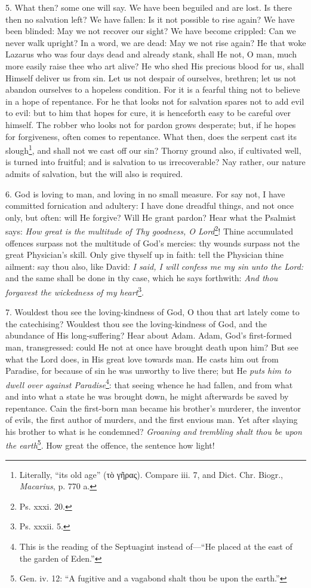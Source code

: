 5. What then? some one will say. We have been beguiled and are lost. Is there then no salvation left? We have fallen: Is it not possible to rise again? We have been blinded: May we not recover our sight? We have become crippled: Can we never walk upright? In a word, we are dead: May we not rise again? He that woke Lazarus who was four days dead and already stank, shall He not, O man, much more easily raise thee who art alive? He who shed His precious blood for us, shall Himself deliver us from sin. Let us not despair of ourselves, brethren; let us not abandon ourselves to a hopeless condition. For it is a fearful thing not to believe in a hope of repentance. For he that looks not for salvation spares not to add evil to evil: but to him that hopes for cure, it is henceforth easy to be careful over himself. The robber who looks not for pardon grows desperate; but, if he hopes for forgiveness, often comes to repentance. What then, does the serpent cast its slough\footnote{Literally, “its old age” (\textgreek{τὸ γῆρας}). Compare iii. 7, and Dict. Chr. Biogr., \emph{Macarius}, p. 770 a.}, and shall not we cast off our sin? Thorny ground also, if cultivated well, is turned into fruitful; and is salvation to us irrecoverable? Nay rather, our nature admits of salvation, but the will also is required.

6. God is loving to man, and loving in no small measure. For say not, I have committed fornication and adultery: I have done dreadful things, and not once only, but often: will He forgive? Will He grant pardon? Hear what the Psalmist says: \emph{How great is the multitude of Thy goodness, O Lord}\footnote{Ps. xxxi. 20.}! Thine accumulated offences surpass not the multitude of God’s mercies: thy wounds surpass not the great Physician’s skill. Only give thyself up in faith: tell the Physician thine ailment: say thou also, like David: \emph{I said, I will confess me my sin unto the Lord:} and the same shall be done in thy case, which he says forthwith: \emph{And thou forgavest the wickedness of my heart}\footnote{Ps. xxxii. 5.}.

7. Wouldest thou see the loving-kindness of God, O thou that art lately come to the catechising? Wouldest thou see the loving-kindness of God, and the abundance of His long-suffering? Hear about Adam. Adam, God’s first-formed man, transgressed: could He not at once have brought death upon him? But see what the Lord does, in His great love towards man. He casts him out from Paradise, for because of sin he was unworthy to live there; but He \emph{puts him to dwell over against Paradise}\footnote{This is the reading of the Septuagint instead of—“He placed at the east of the garden of Eden.”}: that seeing whence he had fallen, and from what and into what a state he was brought down, he might afterwards be saved by repentance. Cain the first-born man became his brother’s murderer, the inventor of evils, the first author of murders, and the first envious man. Yet after slaying his brother to what is he condemned? \emph{Groaning and trembling shalt thou be upon the earth}\footnote{Gen. iv. 12: “A fugitive and a vagabond shalt thou be upon the earth.”}. How great the offence, the sentence how light!

